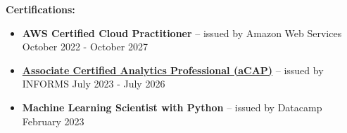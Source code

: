 \documentclass[letterpaper]{cream_class}
\begin{document}
\noindent\textcolor{burgundy}{\noindent\textbf{\large Certifications:}\\[-3ex]}
\vspace{-3pt}
\begin{itemize}[noitemsep, leftmargin=*, itemsep=1pt]
  \item \textbf{\large AWS Certified Cloud Practitioner} -- issued by Amazon Web Services \hfill October 2022 - October 2027
  \item \textbf{\large \href{https://bcert.me/skzxpjuux}{Associate Certified Analytics Professional (aCAP)}} -- issued by INFORMS \hfill July 2023 - July 2026
  \item \textbf{\large Machine Learning Scientist with Python} -- issued by Datacamp \hfill February 2023
\end{itemize}   
\end{document}

